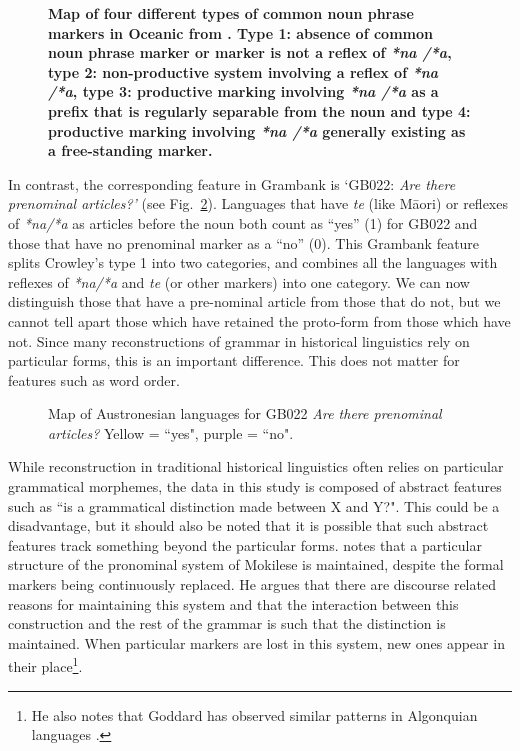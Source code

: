 \documentclass[a4paper,10pt]{article} %
\begin{document}
\begin{figure}
\centering
\caption[Map of four different types of common noun phrase markers in Oceanic from Crowley(1985).]{\textbf{Map of four different types of common noun phrase markers in Oceanic from \citet[162]{crowley1985common}. Type 1: absence of common noun phrase marker or marker is not a reflex of \emph{*na /*a}, type 2: non-productive system involving a reflex of \emph{*na /*a}, type 3: productive marking involving \emph{*na /*a} as a prefix that is regularly separable from the noun and type 4: productive marking involving \emph{*na /*a} generally existing as a free-standing marker.}}
\label{fig:crowley_map}
\end{figure}

In contrast, the corresponding feature in Grambank is `GB022: \emph{Are there prenominal articles?'} (see Fig.~\ref{fig:gb022_map}). Languages that have \emph{te} (like M\={a}ori) or reflexes of \emph{*na/*a} as articles before the noun both count as ``yes'' (1) for GB022 and those that have no prenominal marker as a ``no'' (0). This Grambank feature splits Crowley's type 1 into two categories, and combines all the languages with reflexes of \emph{*na/*a} and \emph{te} (or other markers) into one category. We can now distinguish those that have a pre-nominal article from those that do not, but we cannot tell apart those which have retained the proto-form from those which have not. Since many reconstructions of grammar in historical linguistics rely on particular forms, this is an important difference. This does not matter for features such as word order.

\begin{figure}
\centering
\caption{{Map of Austronesian languages for GB022 \emph{Are there prenominal articles?} Yellow = ``yes", purple = ``no".}}
\label{fig:gb022_map}
\end{figure}

While reconstruction in traditional historical linguistics often relies on particular grammatical morphemes, the data in this study is composed of abstract features such as ``is a grammatical distinction made between X and Y?". This could be a disadvantage, but it should also be noted that it is possible that such abstract features track something beyond the particular forms. \citet[503]{ross2004morphosyntactic} notes that a particular structure of the pronominal system of Mokilese is maintained, despite the formal markers being continuously replaced. He argues that there are discourse related reasons for maintaining this system and that the interaction between this construction and the rest of the grammar is such that the distinction is maintained. When particular markers are lost in this system, new ones appear in their place\footnote{He also notes that Goddard has observed similar patterns in Algonquian languages \citep{goddard1993algonquian}.}.
\end{document}
